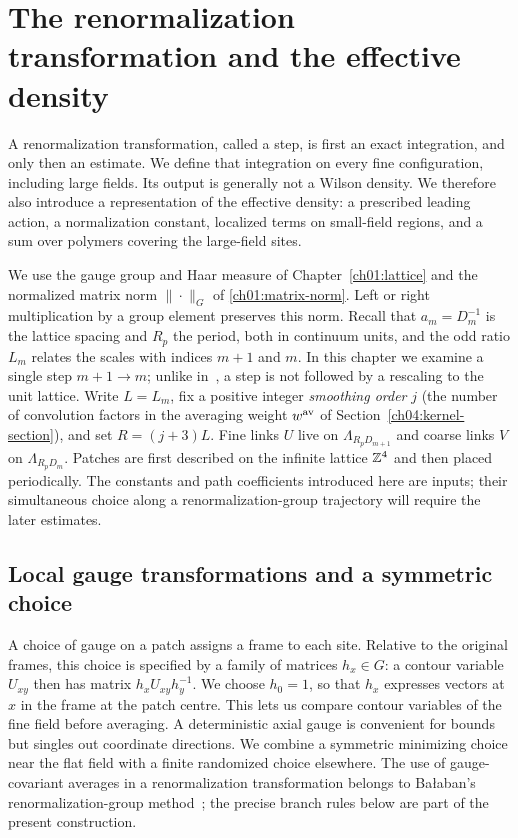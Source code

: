 \chapter{The renormalization transformation and the effective density}
\label{ch04:blocking}

A renormalization transformation, called a step, is first an exact integration, and only then an
estimate. We define that integration on every fine configuration, including
large fields. Its output is generally not a Wilson density. We therefore
also introduce a representation of the effective density: a prescribed leading
action, a normalization constant, localized terms on small-field regions,
and a sum over polymers covering the large-field sites.

We use the gauge group and Haar measure of Chapter~\ref{ch01:lattice}
and the normalized matrix norm $\|\cdot\|_G$ of \eqref{ch01:matrix-norm}.
Left or right multiplication by a group element preserves this norm.
Recall that $a_m=D_m^{-1}$ is the lattice
spacing and $R_p$ the period, both in continuum units, and the odd ratio $L_m$ relates
the scales with indices $m+1$ and $m$. In this chapter we examine a single step
$m+1\to m$; unlike in~\cite{Balaban1984Propagators}, a step is not followed by a rescaling to the unit lattice. Write $L=L_m$, fix a positive integer \emph{smoothing order} $j$ (the number of convolution factors in the averaging weight $w^{\rm av}$ of Section~\ref{ch04:kernel-section}),
and set $R=(j+3)L$. Fine links $U$ live on $\Lambda_{R_pD_{m+1}}$ and coarse
links $V$ on $\Lambda_{R_pD_m}$. Patches are first described on the infinite
lattice $\mathbb Z^4$ and then placed periodically. The constants and path coefficients
introduced here are inputs; their simultaneous choice along a renormalization-group trajectory
will require the later estimates.

\section{Local gauge transformations and a symmetric choice}
\label{ch04:frames}

A choice of gauge on a patch assigns a frame to each site. Relative to
the original frames, this choice is specified by a family of matrices
$h_x\in G$: a contour variable $U_{xy}$ then has matrix $h_xU_{xy}h_y^{-1}$.
We choose $h_0=1$, so that $h_x$ expresses vectors at $x$ in the frame
at the patch centre. This lets us compare contour variables of the fine field before averaging. A deterministic axial gauge is convenient for bounds
but singles out coordinate directions. We combine a symmetric minimizing
choice near the flat field with a finite randomized choice elsewhere.
The use of gauge-covariant averages in a renormalization transformation belongs to
Ba\l{}aban's renormalization-group method~\cite{Balaban1987RG}; the precise
branch rules below are part of the present construction.

